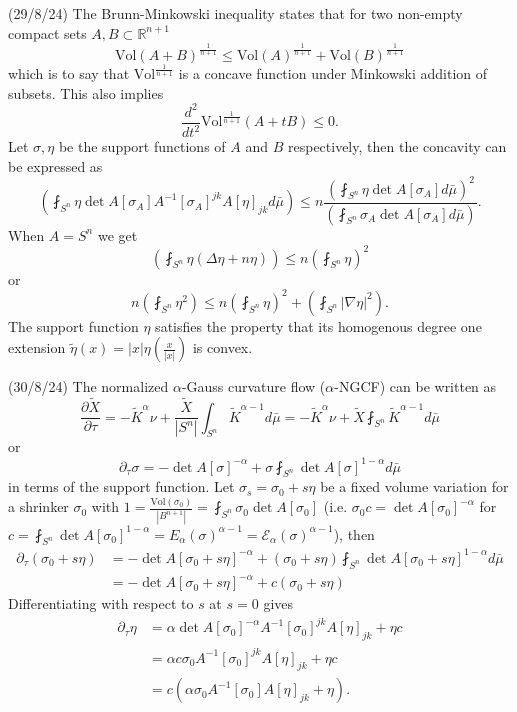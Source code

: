 \documentclass[12pt,a4paper]{article}
\newcommand{\R}{\mathbb{R}}
\begin{document}
(29/8/24) The Brunn-Minkowski inequality states that for two  non-empty compact sets $A, B \subset \R^{n+1} $
\[ \text{Vol}(A+B)^{\frac{1}{n+1}} \le \text{Vol}(A)^{ \frac{1}{n+1}}+ \text{Vol}(B)^{ \frac{1}{n+1}} \]
which is to say that $ \text{Vol}^{\frac{1}{n+1}} $ is a concave function under Minkowski addition of subsets. This also implies 
\[ \frac{d^{2}}{dt^{2}}\text{Vol}^{\frac{1}{n+1}}(A+tB) \le 0. \]
Let $ \sigma , \eta $ be the support functions of $ A $ and $ B $ respectively, then the concavity can be expressed as 
\[ \left( \fint_{S^{n}}\eta \det A[\sigma_{A}] A^{-1}[\sigma_{A}]^{jk}A[\eta]_{jk} d \bar{\mu}\right) \le n \frac{\left( \fint_{S^{n}} \eta\det A[\sigma_{A}] d \bar{\mu}\right)^{2}}{\left( \fint_{S^{n}} \sigma_{A} \det A[\sigma_{A}] d \bar{\mu}\right)}. \]
When $ A = S^{n} $ we get 
\[ \left( \fint_{S^{n}} \eta ( \Delta \eta + n \eta) \right) \le n \left( \fint_{S^{n}} \eta \right)^{2} \]
or 
\[ n\left( \fint_{S^{n}} \eta^{2} \right)\le n \left( \fint_{S^{n}}\eta \right)^{2}  + \left( \fint_{S^{n}} |\nabla \eta|^{2} \right).\]
The support function $ \eta $  satisfies the property that its homogenous degree one extension $ \tilde{\eta}(x) = |x| \eta ( \frac{x}{|x|}) $ is convex.

(30/8/24) The normalized $ \alpha $-Gauss curvature flow ($ \alpha $-NGCF) can be written as 
\[ \frac{\partial \tilde{X}}{\partial \tau} =-\tilde{K}^{\alpha}\nu + \frac{\tilde{X}}{|S^{n}|}\int_{S^{n}}\tilde{K}^{\alpha-1} d \bar{\mu} =-\tilde{K}^{\alpha}\nu + \tilde{X}\fint_{S^{n}}\tilde{K}^{\alpha-1} d \bar{\mu} \]
or 
\[ \partial_{\tau} \sigma = -\det A[\sigma]^{-\alpha} + \sigma \fint_{S^{n}}\det A[\sigma]^{1-\alpha} d\bar{\mu} \]
in terms of the support function. Let $ \sigma_{s} = \sigma_{0}+ s \eta $ be a fixed volume variation for a shrinker $ \sigma_{0} $ with $ 1= \frac{\text{Vol}(\sigma_{0})}{|B^{n+1}|} =\fint_{S^{n}} \sigma_{0}\det A[\sigma_{0}] $ (i.e. $ \sigma_{0}c = \det A[\sigma_{0}]^{-\alpha} $ for $ c = \fint_{S^{n}}\det A[\sigma_{0}]^{1-\alpha} = E_{\alpha}(\sigma)^{\alpha-1} = \mathcal{E}_{\alpha}(\sigma)^{\alpha-1}$), then \begin{align*}
   \partial_{\tau}(\sigma_{0}+ s \eta) & = - \det A[\sigma_{0}+s \eta]^{-\alpha} + (\sigma_{0}+ s \eta)\fint_{S^{n}} \det A[\sigma_{0} + s \eta]^{1-\alpha} d \bar{\mu} \\
   & = - \det A[\sigma_{0}+s \eta]^{-\alpha} + c(\sigma_{0}+ s \eta)
\end{align*}
Differentiating with respect to $ s $ at $ s = 0 $ gives \begin{align*}
   \partial_{\tau}\eta & = \alpha \det A[\sigma_{0}]^{-\alpha}A^{-1}[\sigma_{0}]^{jk}A[\eta]_{jk} + \eta c \\
   & = \alpha c \sigma_{0} A^{-1}[\sigma_{0}]^{jk}A[\eta]_{jk} + \eta c  \\
   & = c \left( \alpha \sigma_{0}A^{-1}[\sigma_{0}]A[\eta]_{jk} + \eta \right).
\end{align*}
\end{document}
